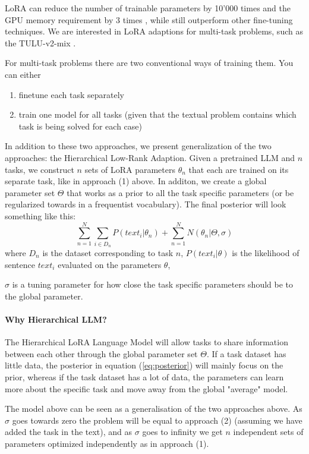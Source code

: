 \documentclass{article}
\begin{document}
LoRA can reduce the number of trainable parameters by 10'000 times and the GPU memory requirement by 3 times \cite{hu_lora_2021}, while still outperform other fine-tuning techniques.
We are interested in LoRA adaptions for multi-task problems, such as the TULU-v2-mix \cite{ivison_camels_2023}.

For multi-task problems there are two conventional ways of training them. You can either 
\begin{enumerate}
    \item finetune each task separately
    \item train one model for all tasks (given that the textual problem contains which task is being solved for each case)
\end{enumerate}

In addition to these two approaches, we present generalization of the two approaches: the Hierarchical Low-Rank Adaption.
Given a pretrained LLM and $n$ tasks, we construct $n$ sets of LoRA parameters $\theta_n$ that each are trained on its separate task, like in approach (1) above. In additon, we create a global parameter set $\Theta$ that works as a prior to all the task specific parameters (or be regularized towards in a frequentist vocabulary).
The final posterior will look something like this:
%
\begin{equation} \label{eq:posterior}
    \sum_{n=1}^N  \sum_{i \in D_n} P(text_i | \theta_n) + \sum_{n=1}^N N(\theta_n | \Theta, \sigma)
\end{equation}
%
where
$D_n$ is the dataset corresponding to task $n$,
$P(text_i | \theta)$ is the likelihood of sentence $text_i$ evaluated on the parameters $\theta$,

$\sigma$ is a tuning parameter for how close the task specific parameters should be to the global parameter.

\paragraph{Why Hierarchical LLM?}
The Hierarchical LoRA Language Model will allow tasks to share information between each other through the global parameter set $\Theta$.
If a task dataset has little data, the posterior  in equation (\ref{eq:posterior}) will mainly focus on the prior, whereas if the task dataset has a lot of data, the parameters can learn more about the specific task and move away from the global "average" model.

The model above can be seen as a generalisation of the two approaches above.
As $\sigma$ goes towards zero the problem will be equal to approach (2) (assuming we have added the task in the text), 
and as $\sigma$ goes to infinity we get $n$ independent sets of parameters optimized independently as in approach (1).
\end{document}
